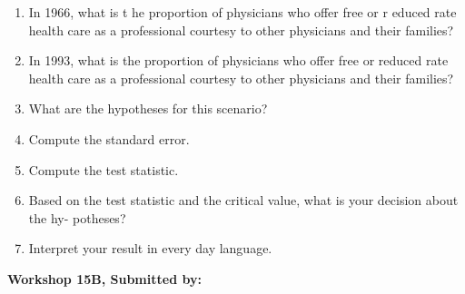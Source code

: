 \documentclass[11pt]{book}\usepackage[]{graphicx}\usepackage[]{color}
\begin{document}
\begin{exercises}
\begin{exercise}
\begin{enumerate}
\item  In 1966, what is t he proportion of physicians who offer free or r educed rate health care as a professional courtesy to other physicians and their families?
\item  In 1993, what is the proportion of physicians who offer free or reduced rate health care as a professional courtesy to other physicians and their families?
\item  What are the hypotheses for this scenario?
\item  Compute the standard error.
\item  Compute the test statistic.
\item  Based on the test statistic and the critical value, what is your decision about the hy- potheses?
\item  Interpret your result in every day language.
\end{enumerate}

\end{exercise}
\begin{solution}  %

\end{solution}

\clearpage

    \begin{exercise}  %

    \begin{center}
\begin{flushleft}\textbf{\large \hfill Workshop 15B, Submitted by: }\end{flushleft}

\end{center}


\end{exercise}
\end{exercises}
\end{document}
